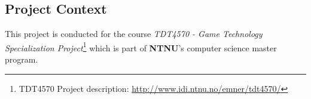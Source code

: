 \subsection{Project Context}
This project is conducted for the course \textit{TDT4570 - Game Technology Specialization Project}\footnote{TDT4570 Project
description: \url{http://www.idi.ntnu.no/emner/tdt4570/}} which is part of
\textbf{NTNU}'s computer science master program.



